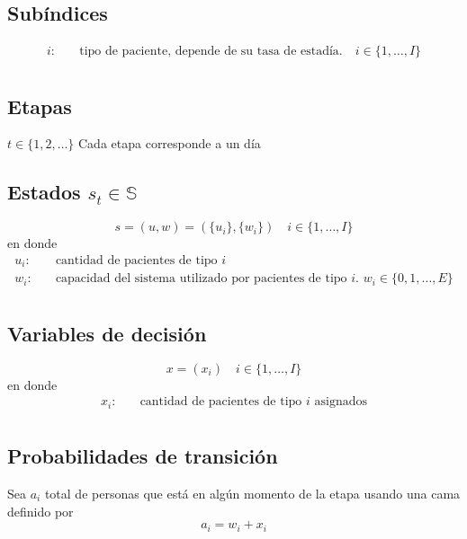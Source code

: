 \documentclass[letterpaper,10pt]{article}
\begin{document}
\subsection*{Subíndices}
    \begin{align*}
        i: & \quad \text{tipo de paciente, depende de su tasa de estadía.} \quad i \in \{1,\ldots, I\} \\
    \end{align*}

\subsection*{Etapas}
$ t \in \{1, 2, \dots \} $
    Cada etapa corresponde a un día

    \subsection*{Estados $s_t \in \mathds{S}$}
    
    $$s = (u, w) = (\{u_{i}\}, \{w_{i}\}) \quad i \in \{1, \ldots, I\} $$ en donde
    \begin{align*}
        u_{i}: & \quad \text{cantidad de pacientes de tipo $i$ }  \\
        w_{i}: & \quad \text{capacidad del sistema utilizado por pacientes de tipo $i$. } w_i \in \{0, 1, \dots, E\}\\
    \end{align*}

\subsection*{Variables de decisión}
    
    $$x = (x_{i}) \quad i \in \{1, \ldots, I\} $$ en donde 
    \begin{align*}
        x_{i}: & \quad \text{cantidad de pacientes de tipo $i$ asignados} \\
    \end{align*}
    
    \subsection*{Probabilidades de transición}
    
    Sea $a_i$ total de personas que está en algún momento de la etapa usando una cama definido por $$a_i = w_i + x_{i}$$
    
\end{document}
